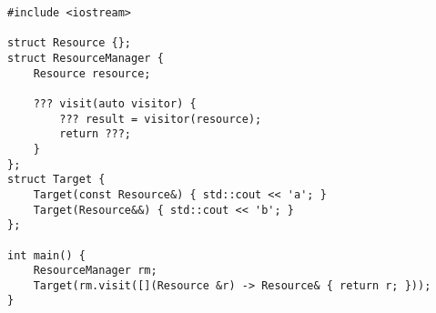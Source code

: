 \begin{lstlisting}[title=\href{https://godbolt.org/z/lnN3l7}{\texttt{godbolt.org/z/lnN3l7}}]
#include <iostream>

struct Resource {};
struct ResourceManager {
    Resource resource;

    ??? visit(auto visitor) {
        ??? result = visitor(resource);
        return ???;
    }
};
struct Target {
    Target(const Resource&) { std::cout << 'a'; }
    Target(Resource&&) { std::cout << 'b'; }
};

int main() {
    ResourceManager rm;
    Target(rm.visit([](Resource &r) -> Resource& { return r; }));
}
\end{lstlisting}
